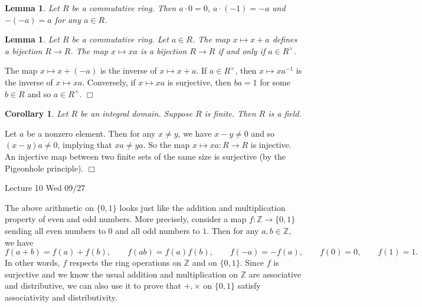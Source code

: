 \documentclass{article}
\def\Z{{\mathbb Z}}
\def\Z{{\mathbb Z}}
\newtheorem{cor}[subsection]{Corollary}
\newtheorem{lemma}[subsection]{Lemma}
\newenvironment{proof}{\noindent {\bf Proof:}}{$\Box$ \vspace{2 ex}}
\newcommand{\add}[1]{{\color{blue} #1}}
\begin{document}
\begin{enumerate}
    \begin{lemma}\label{lem:multi0}
        Let $R$ be a commutative ring. Then $a\cdot 0 = 0$, $a\cdot(-1) = -a$ and $-(-a) = a$ for any $a\in R$.
    \end{lemma}

    \begin{lemma}\label{lem:perm}
        Let $R$ be a commutative ring. Let $a\in R$. The map $x\mapsto x + a$ defines a bijection $R\rightarrow R$. The map $x\mapsto xa$ is a bijection $R\rightarrow R$ if and only if $a\in R^\times$.
    \end{lemma}

    \begin{proof}
        The map $x\mapsto x + (-a)$ is the inverse of $x\mapsto x+a$. If $a\in R^\times$, then $x\mapsto xa^{-1}$ is the inverse of $x\mapsto xa$. Conversely, if $x\mapsto xa$ is surjective, then $ba = 1$ for some $b\in R$ and so $a\in R^\times$.
    \end{proof}

    \begin{cor}
        Let $R$ be an integral domain. Suppose $R$ is finite. Then $R$ is a field.
    \end{cor}

    \begin{proof}
        Let $a$ be a nonzero element. Then for any $x\neq y$, we have $x - y\neq 0$ and so $(x - y)a\neq 0$, implying that $xa\neq ya$. So the map $x\mapsto xa:R\rightarrow R$ is injective. An injective map between two finite sets of the same size is surjective (by the Pigeonhole principle).
    \end{proof}

    \begin{center}
    \add{Lecture 10 Wed 09/27}
\end{center}

    The above arithmetic on $\{0,1\}$ looks just like the addition and multiplication property of even and odd numbers. More precisely, consider a map $f:\Z\rightarrow\{0,1\}$ sending all even numbers to $0$ and all odd numbers to $1$. Then for any $a,b\in\Z$, we have
    $$f(a+b) = f(a) + f(b),\qquad f(ab) = f(a)f(b),\qquad f(-a) = -f(a),\qquad f(0) = 0,\qquad f(1) = 1.$$
    In other words, $f$ respects the ring operations on $\Z$ and on $\{0,1\}$. Since $f$ is surjective and we know the usual addition and multiplication on $\Z$ are associative and distributive, we can also use it to prove that $+,\times$ on $\{0,1\}$ satisfy associativity and distributivity.


\end{enumerate}
\end{document}
